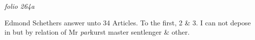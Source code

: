 \documentclass[12pt, a4paper]{book}
\begin{document}
\dotfill
					  \section*{}  \subsection*{}

\textit{folio 264a}



Edmond Schethers answer unto 34 Articles. 
				\marginpar[\vspace{0.5cm}{\textcolor{Gray}{1.2.3.}}]{}
			 To the first, 2 \& 3. I can not depose in but by relation of Mr \textit{par}kurst master sentlenger \& other.
			 
\end{document}

